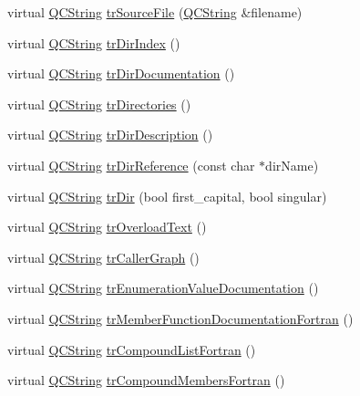 \begin{DoxyCompactItemize}
\item 
virtual \hyperlink{class_q_c_string}{Q\-C\-String} \hyperlink{class_translator_polish_a1b3571c6c75d16ebe3763f510bd95b68}{tr\-Source\-File} (\hyperlink{class_q_c_string}{Q\-C\-String} \&filename)
\item 
virtual \hyperlink{class_q_c_string}{Q\-C\-String} \hyperlink{class_translator_polish_ae9895001e5d8629fd068895b2ffa653f}{tr\-Dir\-Index} ()
\item 
virtual \hyperlink{class_q_c_string}{Q\-C\-String} \hyperlink{class_translator_polish_a89a223d69d1255271719c256b2fd451b}{tr\-Dir\-Documentation} ()
\item 
virtual \hyperlink{class_q_c_string}{Q\-C\-String} \hyperlink{class_translator_polish_ab7610b46aedb923a1524272dfbaeab38}{tr\-Directories} ()
\item 
virtual \hyperlink{class_q_c_string}{Q\-C\-String} \hyperlink{class_translator_polish_abf769d2a217fcf6b9d3b9170fbbae7c8}{tr\-Dir\-Description} ()
\item 
virtual \hyperlink{class_q_c_string}{Q\-C\-String} \hyperlink{class_translator_polish_ae680136bec0ce1d29a1e4e00d871797f}{tr\-Dir\-Reference} (const char $\ast$dir\-Name)
\item 
virtual \hyperlink{class_q_c_string}{Q\-C\-String} \hyperlink{class_translator_polish_abb2b35bd374b96530198bf061054c951}{tr\-Dir} (bool first\-\_\-capital, bool singular)
\item 
virtual \hyperlink{class_q_c_string}{Q\-C\-String} \hyperlink{class_translator_polish_ac5436cb286c48cd540d0cdce200a82b9}{tr\-Overload\-Text} ()
\item 
virtual \hyperlink{class_q_c_string}{Q\-C\-String} \hyperlink{class_translator_polish_ae1d7d38cc426cd25124b1658b1125841}{tr\-Caller\-Graph} ()
\item 
virtual \hyperlink{class_q_c_string}{Q\-C\-String} \hyperlink{class_translator_polish_a4039294191fddf0e9530b920719998fd}{tr\-Enumeration\-Value\-Documentation} ()
\item 
virtual \hyperlink{class_q_c_string}{Q\-C\-String} \hyperlink{class_translator_polish_a006270b30df57f83fe40ad0ed617652e}{tr\-Member\-Function\-Documentation\-Fortran} ()
\item 
virtual \hyperlink{class_q_c_string}{Q\-C\-String} \hyperlink{class_translator_polish_a17985bd956c4940e53e169cadb659c2b}{tr\-Compound\-List\-Fortran} ()
\item 
virtual \hyperlink{class_q_c_string}{Q\-C\-String} \hyperlink{class_translator_polish_add44aa8baf655554ec74dbfac0d43f71}{tr\-Compound\-Members\-Fortran} ()

\end{DoxyCompactItemize}
